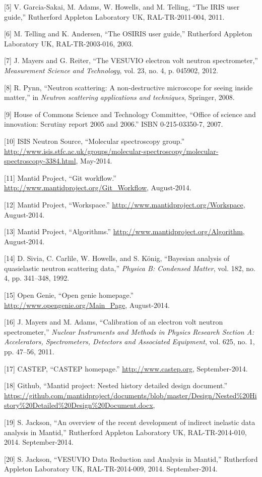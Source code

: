 \documentclass[paper=a4, fontsize=11pt]{scrartcl}	%
\numberwithin{equation}{section}															%
\numberwithin{figure}{section}																%
\numberwithin{table}{section}
\begin{document}
{[}5{]} V. Garcia-Sakai, M. Adams, W. Howells, and M. Telling, ``The
IRIS user guide,'' Rutherford Appleton Laboratory UK, RAL-TR-2011-004,
2011.

{[}6{]} M. Telling and K. Andersen, ``The OSIRIS user guide,''
Rutherford Appleton Laboratory UK, RAL-TR-2003-016, 2003.

{[}7{]} J. Mayers and G. Reiter, ``The VESUVIO electron volt neutron
spectrometer,'' \emph{Measurement Science and Technology}, vol. 23, no.
4, p. 045902, 2012.

{[}8{]} R. Pynn, ``Neutron scattering: A non-destructive microscope for
seeing inside matter,'' in \emph{Neutron scattering applications and
techniques}, Springer, 2008.

{[}9{]} House of Commons Science and Technology Committee, ``Office of
science and innovation: Scrutiny report 2005 and 2006.'' ISBN
0-215-03350-7, 2007.

{[}10{]} ISIS Neutron Source, ``Molecular spectroscopy group.''
\url{http://www.isis.stfc.ac.uk/groups/molecular-spectroscopy/molecular-spectroscopy-3384.html},
May-2014.

{[}11{]} Mantid Project, ``Git workflow.''
\url{http://www.mantidproject.org/Git_Workflow}, August-2014.

{[}12{]} Mantid Project, ``Workspace.''
\url{http://www.mantidproject.org/Workspace}, August-2014.

{[}13{]} Mantid Project, ``Algorithms.''
\url{http://www.mantidproject.org/Algorithm}, August-2014.

{[}14{]} D. Sivia, C. Carlile, W. Howells, and S. K{ö}nig, ``Bayesian
analysis of quasielastic neutron scattering data,'' \emph{Physica B:
Condensed Matter}, vol. 182, no. 4, pp. 341--348, 1992.

{[}15{]} Open Genie, ``Open genie homepage.''
\url{http://www.opengenie.org/Main_Page}, August-2014.

{[}16{]} J. Mayers and M. Adams, ``Calibration of an electron volt
neutron spectrometer,'' \emph{Nuclear Instruments and Methods in Physics
Research Section A: Accelerators, Spectrometers, Detectors and
Associated Equipment}, vol. 625, no. 1, pp. 47--56, 2011.

{[}17{]} CASTEP, ``CASTEP homepage.'' \url{http://www.castep.org},
September-2014.

{[}18{]} Github, ``Mantid project: Nested history detailed design
document.''
\url{https://github.com/mantidproject/documents/blob/master/Design/Nested\%20History\%20Detailed\%20Design\%20Document.docx},

{[}19{]} S. Jackson, ``An overview of the recent development of indirect inelastic data analysis in Mantid,''
Rutherford Appleton Laboratory UK, RAL-TR-2014-010, 2014.
September-2014.

{[}20{]} S. Jackson, ``VESUVIO Data Reduction and Analysis in Mantid,''
Rutherford Appleton Laboratory UK, RAL-TR-2014-009, 2014.
September-2014.
\end{document}
